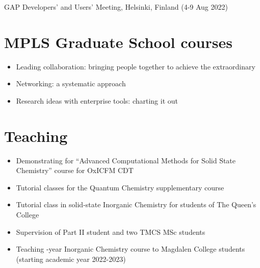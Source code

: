 \documentclass[12pt,a4paper,twoside,nobind]{ociamthesis}
\begin{document}
GAP Developers' and Users' Meeting, Helsinki, Finland (4-9 Aug 2022)

\section*{MPLS Graduate School courses}
\begin{itemize}
  \item Leading collaboration: bringing people together to achieve the extraordinary
  \item Networking: a systematic approach
  \item Research ideas with enterprise tools: charting it out
\end{itemize}

\section*{Teaching}
\begin{itemize}
  \item Demonstrating for ``Advanced Computational Methods for Solid State Chemistry'' course for OxICFM CDT
  \item Tutorial classes for the Quantum Chemistry supplementary course
  \item Tutorial class in solid-state Inorganic Chemistry for students of The Queen's College
  \item Supervision of Part II student and two TMCS MSc students
  \item Teaching -year Inorganic Chemistry course to Magdalen College students (starting academic year 2022-2023)
\end{itemize}
\end{document}
